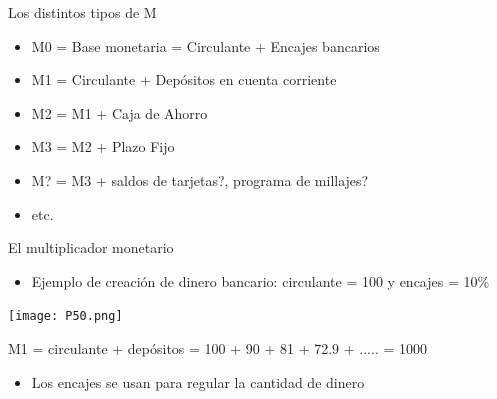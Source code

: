 \documentclass{beamer}
\begin{document}
\begin{frame}{Los distintos tipos de M}
     \begin{itemize}
        \item M0 = Base monetaria = Circulante + Encajes bancarios
        \item M1 = Circulante + Depósitos en cuenta corriente
        \item M2 = M1 + Caja de Ahorro
        \item M3 = M2 + Plazo Fijo
        \item M? = M3 + saldos de tarjetas?, programa de millajes? 
        \item etc.

    \end{itemize}
\end{frame}


\begin{frame}{El multiplicador monetario}

    \begin{itemize}
        \item Ejemplo de creación de dinero bancario:  circulante = 100  y  encajes = 10\%
    \end{itemize}
    
    \vspace{2mm}
    
    \centering\texttt{[image: P50.png]}\
    
    \vspace{2mm}
    
    \begin{tcolorbox}[width=4in, interior hidden, boxsep=0pt,
                  left=0pt, halign=center, valign=center, right=0pt,
                  bottom=3pt, top=3pt, ]%
                 \footnotesize{M1 = circulante + depósitos = 100 + 90 + 81 + 72.9 + ..... = 1000}
    \end{tcolorbox}
        
    \vspace{2mm}
    
    \begin{itemize}
        \item Los encajes se usan para regular la cantidad de dinero
    \end{itemize}

\end{frame}
\end{document}
